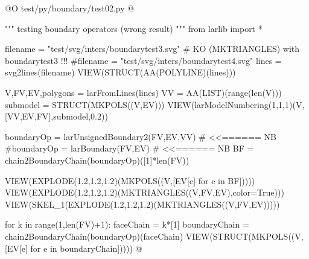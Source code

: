 \documentclass[11pt,oneside]{article}    %
\begin{document}
@O test/py/boundary/test02.py
@{""" testing boundary operators (wrong result) """
from larlib import *

filename = "test/svg/inters/boundarytest3.svg" # KO (MKTRIANGLES) with boundarytest3 !!!
#filename = "test/svg/inters/boundarytest4.svg"
lines = svg2lines(filename)
VIEW(STRUCT(AA(POLYLINE)(lines)))
    
V,FV,EV,polygons = larFromLines(lines)
VV = AA(LIST)(range(len(V)))
submodel = STRUCT(MKPOLS((V,EV)))
VIEW(larModelNumbering(1,1,1)(V,[VV,EV,FV],submodel,0.2))

boundaryOp = larUnsignedBoundary2(FV,EV,VV)  # <<======  NB
#boundaryOp = larBoundary(FV,EV)  # <<======  NB
BF = chain2BoundaryChain(boundaryOp)([1]*len(FV))

VIEW(EXPLODE(1.2,1.2,1.2)(MKPOLS((V,[EV[e] for e in BF])))) 
VIEW(EXPLODE(1.2,1.2,1.2)(MKTRIANGLES((V,FV,EV),color=True))) 
VIEW(SKEL_1(EXPLODE(1.2,1.2,1.2)(MKTRIANGLES((V,FV,EV))))) 

for k in range(1,len(FV)+1):
    faceChain = k*[1]
    boundaryChain = chain2BoundaryChain(boundaryOp)(faceChain)
    VIEW(STRUCT(MKPOLS((V,[EV[e] for e in boundaryChain]))))
@}
\end{document}
